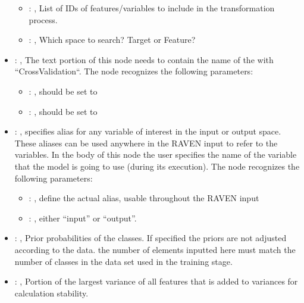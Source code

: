 \begin{itemize}
\begin{itemize}
        \item {}: , 
          List of IDs of features/variables to include in the transformation process.

        \item {}: , 
          Which space to search? Target or Feature?
      \end{itemize}

    \item {}: , 
      The text portion of this node needs to contain the name of the  with
               ``CrossValidation``.
      The  node recognizes the following parameters:
        \begin{itemize}
          \item {}: , 
            should be set to 
          \item {}: , 
            should be set to 
      \end{itemize}

    \item {}: , 
      specifies alias for         any variable of interest in the input or output space. These
      aliases can be used anywhere in the RAVEN input to         refer to the variables. In the body
      of this node the user specifies the name of the variable that the model is going to use
      (during its execution).
      The  node recognizes the following parameters:
        \begin{itemize}
          \item {}: , 
            define the actual alias, usable throughout the RAVEN input
          \item {}: , 
            either ``input'' or ``output''.
      \end{itemize}

    \item {}: , 
      Prior probabilities of the classes. If specified the priors are
      not adjusted according to the data. \nb the number of elements inputted here must
      match the number of classes in the data set used in the training stage.

    \item {}: , 
      Portion of the largest variance of all features that is added to variances for
      calculation stability.
  \end{itemize}


